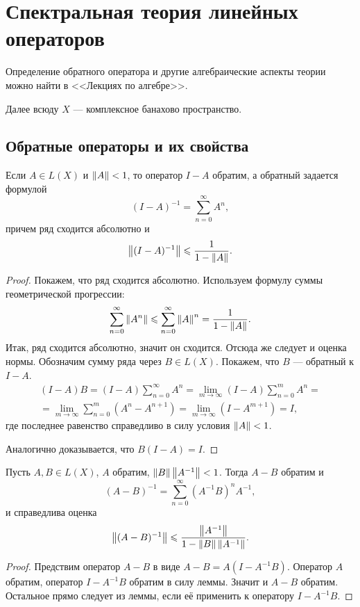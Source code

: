 \section{Спектральная теория линейных операторов}
Определение обратного оператора и другие алгебраические аспекты теории можно найти
в <<Лекциях по алгебре>>.

Далее всюду $X$ --- комплексное банахово пространство.
\subsection{Обратные операторы и их свойства}
\begin{lemma}\label{le:neumann}
    Если $A \in L(X)$ и $\left\|A\right\| < 1$, то оператор $I - A$ обратим, а обратный задается формулой
    \[ (I - A)^{-1} = \sum_{n = 0}^\infty A^n, \]
    причем ряд сходится абсолютно и
    \[ \left\|(I-A)^{-1}\right\| \leqslant \frac{1}{1-\left\|A\right\|}. \]
\end{lemma}

\begin{proof}
    Покажем, что ряд сходится абсолютно. Используем формулу суммы геометрической прогрессии:
    \[ \sum_{n=0}^\infty \left\|A^n\right\| \leqslant \sum_{n=0}^\infty \left\|A\right\|^n = \frac{1}{1-\left\|A\right\|}. \]
    Итак, ряд сходится абсолютно, значит он сходится. Отсюда же следует и оценка нормы.
    Обозначим сумму ряда через $B \in L(X)$. Покажем, что $B$ --- обратный к $I - A$.
    \begin{multline*}
        (I - A)B = (I - A)\sum_{n=0}^\infty A^n = \lim_{m\to \infty} (I - A)\sum_{n=0}^m A^n = \\
            = \lim_{m \to \infty} \sum_{n=0}^m (A^n - A^{n+1}) = \lim_{m\to \infty} (I - A^{m+1})
            = I,
    \end{multline*}
    где последнее равенство справедливо в силу условия $\left\|A\right\| < 1$.

    Аналогично доказывается, что $B(I - A) = I$.
\end{proof}

\begin{theorem}
    Пусть $A, B \in L(X)$, $A$ обратим, $\left\|B\right\|\left\|A^{-1}\right\| < 1$. Тогда $A - B$ обратим и
    \[ (A-B)^{-1} = \sum_{n=0}^\infty (A^{-1}B)^n A^{-1}, \]
    и справедлива оценка
    \[ \left\|(A-B)^{-1}\right\| \leqslant \frac{\left\|A^{-1}\right\|}{1-\left\|B\right\|\left\|A^{-1}\right\|}. \]
\end{theorem}

\begin{proof}
    Предствим оператор $A-B$ в виде $A - B = A(I-A^{-1}B)$. Оператор $A$ обратим, оператор
    $I-A^{-1}B$ обратим в силу леммы. Значит и $A - B$ обратим. Остальное прямо следует из леммы,
    если её применить к оператору $I-A^{-1}B$.
\end{proof}

